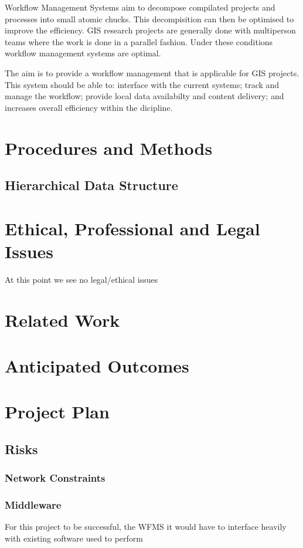 \documentclass[12pt,a4paper]{article}
\begin{document}
Workflow Management Systems aim to decompose compilated projects and processes into
small atomic chucks. This decompisition can then be optimised to improve the efficiency.
GIS research projects are generally done with multiperson teams where the work is
done in a parallel fashion. Under these conditions workflow management systems
are optimal.

The aim is to provide a workflow management that is applicable for GIS projects.
This system should be able to: interface with the current systems; track and
manage the workflow; provide local data availabilty and content delivery; and
increases overall efficiency within the dicipline.

\section{Procedures and Methods}
\subsection{Hierarchical Data Structure}

\section{Ethical, Professional and Legal Issues}
At this point we see no legal/ethical issues
\section{Related Work}
\section{Anticipated Outcomes}
\section{Project Plan}
\subsection{Risks}
\subsubsection*{Network Constraints}
\subsubsection*{Middleware}
For this project to be successful, the WFMS it would have to interface
heavily with existing software used to perform
\end{document}
